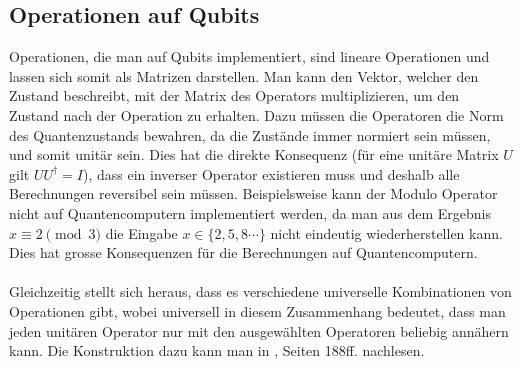\subsection{Operationen auf Qubits}
Operationen, die man auf Qubits implementiert, sind lineare Operationen und lassen sich somit als Matrizen darstellen. Man kann den Vektor, welcher den Zustand beschreibt, mit der Matrix des Operators multiplizieren, um den Zustand nach der Operation zu erhalten. Dazu müssen die Operatoren die Norm des Quantenzustands bewahren, da die Zustände immer normiert sein müssen, und somit unitär sein. Dies hat die direkte Konsequenz (für eine unitäre Matrix $U$ gilt $UU^{\dagger} = I$), dass ein inverser Operator existieren muss und deshalb alle Berechnungen reversibel sein müssen. Beispielsweise kann der Modulo Operator nicht auf Quantencomputern implementiert werden, da man aus dem Ergebnis $x \equiv 2 \pmod{3}$ die Eingabe $x \in \{2, 5, 8\cdots\}$ nicht eindeutig wiederherstellen kann. Dies hat grosse Konsequenzen für die Berechnungen auf Quantencomputern.
\paragraph{}
Gleichzeitig stellt sich heraus, dass es verschiedene universelle Kombinationen von Operationen gibt, wobei universell in diesem Zusammenhang bedeutet, dass man jeden unitären Operator nur mit den ausgewählten Operatoren beliebig annähern kann. Die Konstruktion dazu kann man in \cite{QC}, Seiten 188ff. nachlesen.

